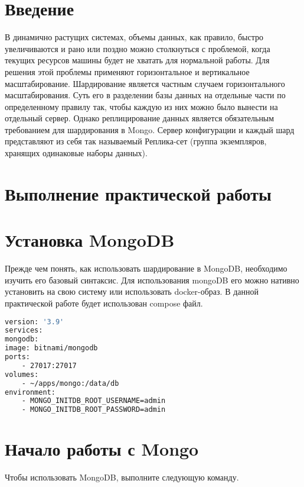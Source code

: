 \section*{\LARGE Введение}

В динамично растущих системах, объемы данных, как правило, быстро
увеличиваются и рано или поздно можно столкнуться с проблемой, когда
текущих ресурсов машины будет не хватать для нормальной работы.
 Для решения этой проблемы применяют горизонтальное и вертикальное
масштабирование. Шардирование является частным случаем горизонтального
масштабирования. Суть его в разделении базы данных на отдельные части по
определенному правилу так, чтобы каждую из них можно было вынести на
отдельный сервер. Однако реплицирование данных является обязательным
требованием для шардирования в Mongo. Сервер конфигурации и каждый шард
представляют из себя так называемый Реплика-сет (группа экземпляров,
хранящих одинаковые наборы данных).

\clearpage
\section*{\LARGE Выполнение практической работы}

\section{Установка MongoDB}

Прежде чем понять, как использовать шардирование в MongoDB,
необходимо изучить его базовый синтаксис.
Для использования mongoDB его можно нативно установить на свою
систему или использовать docker-образ. В данной практической работе будет
использован compose файл.

\begin{lstlisting}[language=bash]
version: '3.9'
services:
mongodb:
image: bitnami/mongodb
ports:
	- 27017:27017
volumes:
	- ~/apps/mongo:/data/db
environment:
	- MONGO_INITDB_ROOT_USERNAME=admin
	- MONGO_INITDB_ROOT_PASSWORD=admin
\end{lstlisting}

\clearpage
\section{Начало работы с Mongo}

Чтобы использовать MongoDB, выполните следующую команду.

